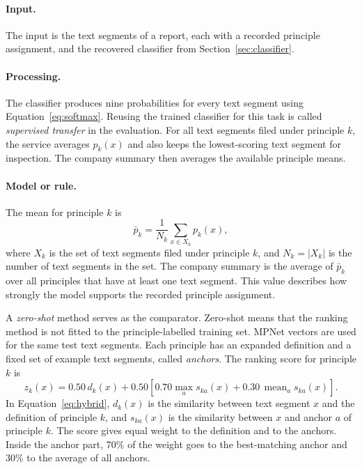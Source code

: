 \paragraph{Input.} The input is the text segments of a report, each with a recorded principle assignment, and the recovered classifier from Section~\ref{sec:classifier}.

\paragraph{Processing.} The classifier produces nine probabilities for every text segment using Equation~\eqref{eq:softmax}. Reusing the trained classifier for this task is called \emph{supervised transfer} in the evaluation. For all text segments filed under principle $k$, the service averages $p_k(x)$ and also keeps the lowest-scoring text segment for inspection. The company summary then averages the available principle means.

\paragraph{Model or rule.} The mean for principle $k$ is
\begin{equation}
\bar{p}_k=\frac{1}{N_k}\sum_{x\in X_k}p_k(x),
\label{eq:mapmean}
\end{equation}
where $X_k$ is the set of text segments filed under principle $k$, and $N_k=|X_k|$ is the number of text segments in the set. The company summary is the average of $\bar{p}_k$ over all principles that have at least one text segment. This value describes how strongly the model supports the recorded principle assignment.

A \emph{zero-shot} method serves as the comparator. Zero-shot means that the ranking method is not fitted to the principle-labelled training set. MPNet vectors are used for the same test text segments. Each principle has an expanded definition and a fixed set of example text segments, called \emph{anchors}. The ranking score for principle $k$ is
\begin{equation}
z_k(x)=0.50\,d_k(x)+0.50\left[0.70\max_a s_{ka}(x)+0.30\,\operatorname{mean}_a s_{ka}(x)\right].
\label{eq:hybrid}
\end{equation}
In Equation~\eqref{eq:hybrid}, $d_k(x)$ is the similarity between text segment $x$ and the definition of principle $k$, and $s_{ka}(x)$ is the similarity between $x$ and anchor $a$ of principle $k$. The score gives equal weight to the definition and to the anchors. Inside the anchor part, 70\% of the weight goes to the best-matching anchor and 30\% to the average of all anchors.

